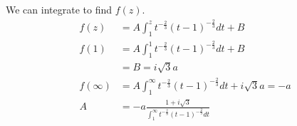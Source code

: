 \begin{example}
    We can integrate to find $f(z)$.
    \begin{align*}
        f(z)      & = A\int_{1}^{z} t^{-\frac{2}{3}}(t - 1)^{-\frac{2}{3}}dt + B                       \\
        f(1)      & = A\int_{1}^{1} t^{-\frac{2}{3}}(t - 1)^{-\frac{2}{3}}dt + B                       \\
                  & = B = i\sqrt3 a                                                                    \\
        f(\infty) & = A\int_{1}^{\infty} t^{-\frac{2}{3}}(t - 1)^{-\frac{2}{3}}dt + i\sqrt3 a = -a     \\
        A         & = -a\frac{1 + i\sqrt3}{\int_{1}^{\infty} t^{-\frac{2}{3}}(t - 1)^{-\frac{2}{3}}dt}
    \end{align*}
\end{example}